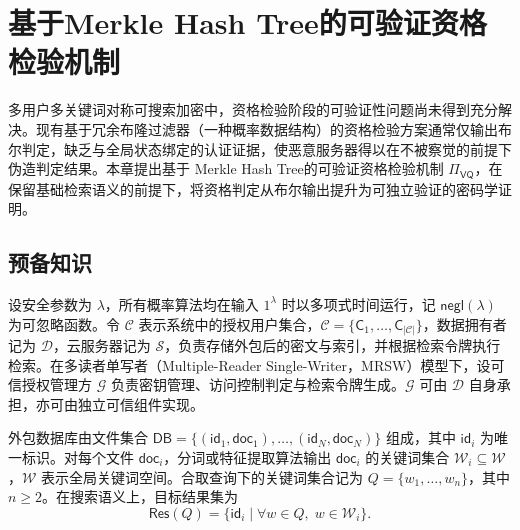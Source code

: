\chapter{基于Merkle Hash Tree的可验证资格检验机制}\label{chap:bf}
多用户多关键词对称可搜索加密中，资格检验阶段的可验证性问题尚未得到充分解决。现有基于冗余布隆过滤器（一种概率数据结构）的资格检验方案通常仅输出布尔判定，缺乏与全局状态绑定的认证证据，使恶意服务器得以在不被察觉的前提下伪造判定结果。本章提出基于 Merkle Hash Tree的可验证资格检验机制 $\Pi_{\mathsf{VQ}}$，在保留基础检索语义的前提下，将资格判定从布尔输出提升为可独立验证的密码学证明。

\section{预备知识}
设安全参数为 $\lambda$，所有概率算法均在输入 $1^\lambda$ 时以多项式时间运行，记 $\mathsf{negl}(\lambda)$ 为可忽略函数。令 $\mathcal{C}$ 表示系统中的授权用户集合，$\mathcal{C}=\{\mathsf{C}_1,\ldots,\mathsf{C}_{|\mathcal{C}|}\}$，数据拥有者记为 $\mathcal{D}$，云服务器记为 $\mathcal{S}$，负责存储外包后的密文与索引，并根据检索令牌执行检索。在多读者单写者（Multiple-Reader Single-Writer，MRSW）模型下\cite{10.1145/2636328}，设可信授权管理方 $\mathcal{G}$ 负责密钥管理、访问控制判定与检索令牌生成。$\mathcal{G}$ 可由 $\mathcal{D}$ 自身承担，亦可由独立可信组件实现。

外包数据库由文件集合 $\mathsf{DB}=\{(\mathsf{id}_1,\mathsf{doc}_1),\ldots,(\mathsf{id}_N,\mathsf{doc}_N)\}$ 组成，其中 $\mathsf{id}_i$ 为唯一标识。对每个文件 $\mathsf{doc}_i$，分词或特征提取算法输出 $\mathsf{doc}_i$ 的关键词集合 $\mathcal{W}_i\subseteq \mathcal{W}$，$\mathcal{W}$ 表示全局关键词空间。合取查询下的关键词集合记为 $Q=\{w_1,\ldots,w_n\}$，其中 $n\ge 2$。在搜索语义上，目标结果集为
\begin{equation}
\mathsf{Res}(Q)=\{\mathsf{id}_i\mid \forall w\in Q,\; w\in\mathcal{W}_i\}.
\end{equation}

